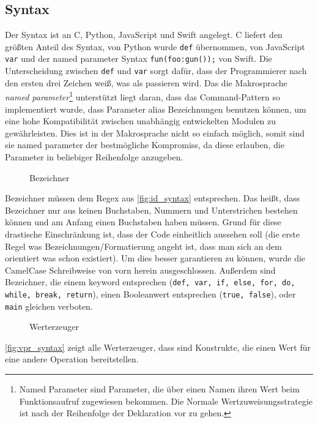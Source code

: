   \subsection{Syntax}
  \label{ssec:Syntax}
    Der Syntax ist an C, Python, JavaScript und Swift angelegt. C liefert den größten Anteil des Syntax, von Python wurde \lstinline[style=MyMacroStyle]$def$ übernommen, von JavaScript \lstinline[style=MyMacroStyle]$var$ und der named parameter Syntax \lstinline[style=MyMacroStyle]$fun(foo:gun());$ von Swift. Die Unterscheidung zwischen \lstinline[style=MyMacroStyle]$def$ und \lstinline[style=MyMacroStyle]$var$ sorgt dafür, dass der Programmierer nach den ersten drei Zeichen weiß, was als passieren wird. Das die Makrosprache \emph{named parameter}\footnote{
      Named Parameter sind Parameter, die über einen Namen ihren Wert beim Funktionsaufruf zugewiesen bekommen. Die Normale Wertzuweisungsstrategie ist nach der Reihenfolge der Deklaration vor zu gehen.
    } unterstützt liegt daran, dass das Command-Pattern so implementiert wurde, dass Parameter alias Bezeichnungen benutzen können, um eine hohe Kompatibilität zwischen unabhängig entwickelten Modulen zu gewährleisten. Dies ist in der Makrosprache nicht so einfach möglich, somit sind sie named parameter der bestmögliche Kompromiss, da diese erlauben, die Parameter in beliebiger Reihenfolge anzugeben.

    \begin{figure}[H]
      \centering
      \caption{Bezeichner}
      \label{fig:id_syntax}
    \end{figure}
    Bezeichner müssen dem Regex aus \autoref{fig:id_syntax} entsprechen. Das heißt, dass Bezeichner nur aus keinen Buchstaben, Nummern und Unterstrichen bestehen können und am Anfang einen Buchstaben haben müssen. Grund für diese drastische Einschränkung ist, dass der Code einheitlich aussehen soll (die erste Regel was Bezeichnungen/Formatierung angeht ist, dass man sich an dem orientiert was schon existiert). Um dies besser garantieren zu können, wurde die CamelCase Schreibweise von vorn herein ausgeschlossen. Außerdem sind Bezeichner, die einem keyword entsprechen (\lstinline[style=MyMacroStyle]$def, var, if, else, for, do, while, break, return$), einen Booleanwert entsprechen (\lstinline[style=MyMacroStyle]$true, false$), oder \lstinline[style=MyMacroStyle]$main$ gleichen verboten.

    \begin{figure}[H]
      \centering
      \caption{Werterzeuger}
      \label{fig:vpr_syntax}
    \end{figure}
    \autoref{fig:vpr_syntax} zeigt alle Werterzeuger, dass sind Konstrukte, die einen Wert für eine andere Operation bereitstellen.

